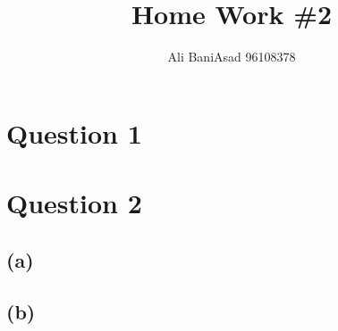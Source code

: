 \documentclass{article}
\title{Home Work \#2}
\author{Ali BaniAsad 96108378}
\begin{document}
	\maketitle
	\section*{Question 1}
	
	\section*{Question 2}
	\subsection*{(a)}
	
	\subsection*{(b)}
	
\end{document}
